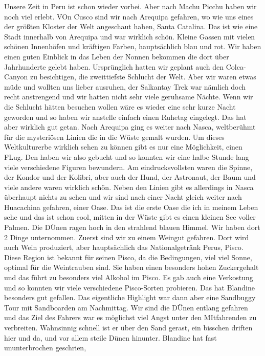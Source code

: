 \documentclass[11pt]{book}
\begin{document}
Unsere Zeit in Peru ist schon wieder vorbei. Aber nach Machu Picchu haben wir noch viel erlebt. VOn Cusco sind wir nach Arequipa gefahren, wo wie uns 
eines der größten Kloster der Welt angeschaut haben, Santa Catalina. Das ist wie eine Stadt innerhalb von Arequipa und war wirklich schön. Kleine Gassen 
mit vielen schönen Innenhöfen und kräftigen Farben, hauptsächlich blau und rot. Wir haben einen guten Einblick in das Leben der Nonnen bekommen die dort 
über Jahrhunderte gelebt haben. Ursprünglich hatten wir geplant auch den Colca-Canyon zu besichtigen, die zweittiefste Schlucht der Welt. Aber wir 
waren etwas müde und wollten uns lieber ausruhen, der Salkantay Trek war nämlich doch recht anstrengend und wir hatten nicht sehr viele geruhsame Nächte. 
Wenn wir die Schlucht hätten besuchen wollen wäre es wieder eine sehr kurze Nacht geworden und so haben wir anstelle einfach einen Ruhetag eingelegt. Das 
hat aber wirklich gut getan. Nach Arequipa ging es weiter nach Nasca, weltberühmt für die mysteriösen Linien die in die Wüste gemalt wurden. Um dieses 
Weltkulturerbe wirklich sehen zu können gibt es nur eine Möglichkeit, einen FLug. Den haben wir also gebucht und so konnten wir eine halbe Stunde lang 
viele verschiedene Figuren bewundern. Am eindrucksvollsten waren die Spinne, der Kondor und der Kolibri, aber auch der Hund, der Astronaut, der Baum 
und viele andere waren wirklich schön. Neben den Linien gibt es allerdings in Nasca überhaupt nichts zu sehen und wir sind nach einer Nacht gleich weiter 
nach Huacachina gefahren, einer Oase. Das ist die erste Oase die ich in meinem Leben sehe und das ist schon cool, mitten in der Wüste gibt es einen kleinen 
See voller Palmen. Die DÜnen ragen hoch in den strahlend blauen Himmel. Wir haben dort 2 Dinge unternommen. Zuerst sind wir zu einem Weingut gefahren. Dort 
wird auch Wein produziert, aber hauptsächlich das Nationalgetränk Perus, Pisco. Diese Region ist bekannt für seinen Pisco, da die Bedingungen, viel viel Sonne, 
optimal für die Weintrauben sind. Sie haben einen besonders hohen Zuckergehalt und das führt zu besonders viel Alkohol im Pisco. Es gab auch eine Verkostung 
und so konnten wir viele verschiedene Pisco-Sorten probieren. Das hat Blandine besonders gut gefallen. Das eigentliche Highlight war dann aber eine Sandbuggy 
Tour mit Sandboarden am Nachmittag. Wir sind die DÜnen entlang gefahren und das Ziel des Fahrers war es möglichst viel Angst unter den MItfahrenden zu verbreiten. 
Wahnsinnig schnell ist er über den Sand gerast, ein bisschen driften hier und da, und vor allem steile Dünen hinunter. Blandine hat fast ununterbrochen geschrien, 
\end{document}

